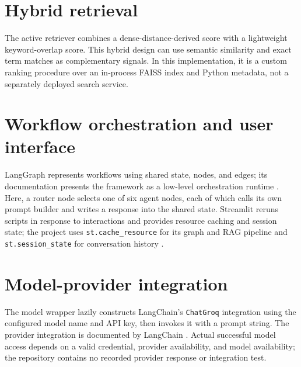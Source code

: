 \section{Hybrid retrieval}
The active retriever combines a dense-distance-derived score with a lightweight keyword-overlap score. This hybrid design can use semantic similarity and exact term matches as complementary signals. In this implementation, it is a custom ranking procedure over an in-process FAISS index and Python metadata, not a separately deployed search service.

\section{Workflow orchestration and user interface}
LangGraph represents workflows using shared state, nodes, and edges; its documentation presents the framework as a low-level orchestration runtime \citep{langgraphdocs}. Here, a router node selects one of six agent nodes, each of which calls its own prompt builder and writes a response into the shared state. Streamlit reruns scripts in response to interactions and provides resource caching and session state; the project uses \texttt{st.cache\_resource} for its graph and RAG pipeline and \texttt{st.session\_state} for conversation history \citep{streamlitcache}.

\section{Model-provider integration}
The model wrapper lazily constructs LangChain's \texttt{ChatGroq} integration using the configured model name and API key, then invokes it with a prompt string. The provider integration is documented by LangChain \citep{chatgroqdocs}. Actual successful model access depends on a valid credential, provider availability, and model availability; the repository contains no recorded provider response or integration test.
